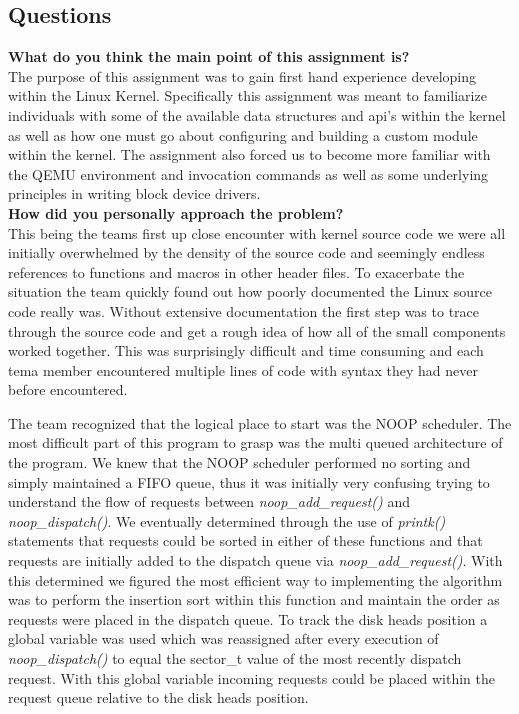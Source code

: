 \documentclass[10pt,onecolumn,draftclsnofoot]{IEEEtran} %
\begin{document}
\begin{singlespace}
\newpage
\section{\bf Questions}

        \textbf{What do you think the main point of this assignment is?}\\

                \normalfont \indent The purpose of this assignment was to gain first hand experience developing within the Linux Kernel. Specifically this assignment was meant to familiarize individuals with some of the available data structures and api's within the kernel as well as how one must go about configuring and building a custom module within the kernel. The assignment also forced us to become more familiar with the QEMU environment and invocation commands as well as some underlying principles in writing block device drivers.\\

        \textbf{How did you personally approach the problem?}\\

                \normalfont \indent This being the teams first up close encounter with kernel source code we were all initially overwhelmed by the density of the source code and seemingly endless references to functions and macros in other header files. To exacerbate the situation the team quickly found out how poorly documented the Linux source code really was. Without extensive documentation the first step was to trace through the source code and get a rough idea of how all of the small components worked together. This was surprisingly difficult and time consuming and each tema member encountered multiple lines of code with syntax they had never before encountered.

                \normalfont \indent The team recognized that the logical place to start was the NOOP scheduler. The most difficult part of this program to grasp was the multi queued architecture of the program. We knew that the NOOP scheduler performed no sorting and simply maintained a FIFO queue, thus it was initially very confusing trying to understand the flow of requests between \textit{noop\_add\_request()} and \textit{noop\_dispatch()}. We eventually determined through the use of \textit{printk()} statements that requests could be sorted in either of these functions and that requests are initially added to the dispatch queue via \textit{noop\_add\_request()}. With this determined we figured the most efficient way to implementing the algorithm was to perform the insertion sort within this function and maintain the order as requests were placed in the dispatch queue. To track the disk heads position a global variable was used which was reassigned after every execution of \textit{noop\_dispatch()} to equal the sector\_t value of the most recently dispatch request. With this global variable incoming requests could be placed within the request queue relative to the disk heads position.\\



\end{singlespace}
\end{document}
